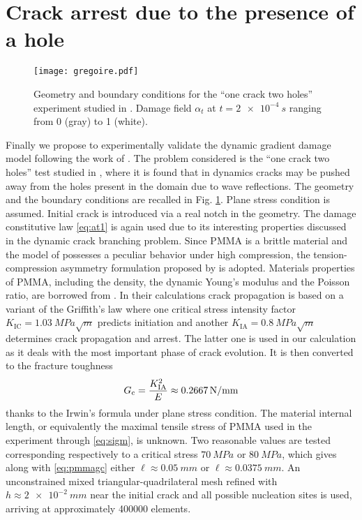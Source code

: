 \section{Crack arrest due to the presence of a hole}
\begin{figure}[htbp]
\centering
\texttt{[image: gregoire.pdf]}
\caption{Geometry and boundary conditions for the ``one crack two holes'' experiment studied in \cite{HaboussaGregoireElguedjMaigreCombescure:2011}. Damage field $\alpha_t$ at $t=\SI{2e-4}{s}$ ranging from 0 (gray) to 1 (white).} \label{fig:gregoire}
\end{figure}
Finally we propose to experimentally validate the dynamic gradient damage model following the work of \cite{DallyWeinberg:2015}. The problem considered is the ``one crack two holes'' test studied in \cite{HaboussaGregoireElguedjMaigreCombescure:2011}, where it is found that in dynamics cracks may be pushed away from the holes present in the domain due to wave reflections. The geometry and the boundary conditions are recalled in Fig. \ref{fig:gregoire}. Plane stress condition is assumed. Initial crack is introduced via a real notch in the geometry. The damage constitutive law \eqref{eq:at1} is again used due to its interesting properties discussed in the dynamic crack branching problem. Since PMMA is a brittle material \cite{GregoireMaigreRethoreCombescure:2007} and the model of \cite{MieheHofackerWelschinger:2010} possesses a peculiar behavior under high compression, the tension-compression asymmetry formulation proposed by \cite{FreddiRoyer-Carfagni:2010} is adopted. Materials properties of PMMA, including the density, the dynamic Young's modulus and the Poisson ratio, are borrowed from \cite{HaboussaGregoireElguedjMaigreCombescure:2011}. In their calculations crack propagation is based on a variant of the Griffith's law where one critical stress intensity factor $K_\mathrm{IC}=\SI{1.03}{MPa\sqrt{m}}$ predicts initiation and another $K_\mathrm{IA}=\SI{0.8}{MPa\sqrt{m}}$ determines crack propagation and arrest. The latter one is used in our calculation as it deals with the most important phase of crack evolution. It is then converted to the fracture toughness
\begin{equation} \label{eq:pmmagc}
G_\mathrm{c}=\frac{K_\mathrm{IA}^2}{E}\approx\SI{0.2667}{N/mm}
\end{equation}
thanks to the Irwin's formula under plane stress condition. The material internal length, or equivalently the maximal tensile stress of PMMA used in the experiment through \eqref{eq:sigm}, is unknown. Two reasonable values are tested corresponding respectively to a critical stress $\SI{70}{MPa}$ or $\SI{80}{MPa}$, which gives along with \eqref{eq:pmmagc} either $\ell\approx\SI{0.05}{mm}$ or $\ell\approx\SI{0.0375}{mm}$. An unconstrained mixed triangular-quadrilateral mesh refined with $h\approx\SI{2e-2}{mm}$ near the initial crack and all possible nucleation sites is used, arriving at approximately \num{400000} elements.
